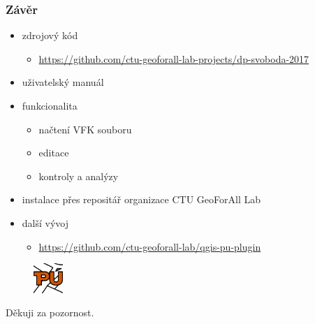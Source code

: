 \documentclass{beamer}
\begin{document}
\begin{frame}

\frametitle{Závěr}

\begin{itemize}
	\item zdrojový kód
	\begin{itemize}
		\item \url{https://github.com/ctu-geoforall-lab-projects/dp-svoboda-2017}
	\end{itemize}
	\item uživatelský manuál
	\item funkcionalita
	\begin{itemize}
		\item načtení VFK souboru
		\item editace
		\item kontroly a analýzy
	\end{itemize}
	\item instalace přes repositář organizace CTU GeoForAll Lab
	\item další vývoj
	\begin{itemize}
		\item \url{https://github.com/ctu-geoforall-lab/qgis-pu-plugin}
	\end{itemize}
\end{itemize}

\begin{figure}[ht]
	\includegraphics[width=0.1\textwidth]{pictures/puplugin.png}
\end{figure}


\end{frame}


\begin{frame}

\Huge{\centerline{Děkuji za pozornost.}}

\end{frame}
\end{document}
